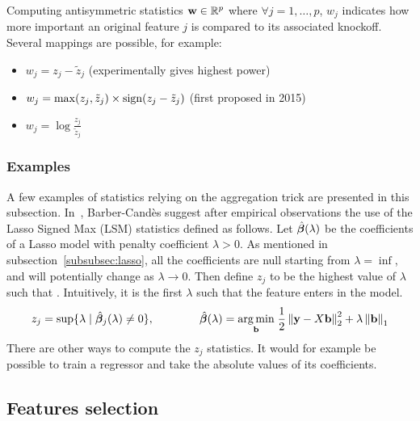 Computing antisymmetric statistics $\mathbf{w} \in \mathbb{R}^p$ where $\forall j = 1, \dots, p$, $w_j$
indicates how more important an original feature $j$ is compared to its associated knockoff.
Several mappings are possible, for example:
\begin{itemize}
    \item $w_j = z_j - \tilde{z}_j$ (experimentally gives highest power)
    \item $w_j = \max(z_j, \tilde{z}_j) \times \operatorname*{sign}(z_j - \tilde{z}_j)$ (first proposed in 2015)
    \item $w_j = \log\frac{z_j}{\tilde{z}_j}$
\end{itemize}

\subsubsection{Examples}\label{subsubsec:sce}

A few examples of statistics relying on the aggregation trick are presented in this subsection.
In~\cite{fixed_x_knockoffs}, Barber-Candès suggest after empirical observations the use of the
Lasso Signed Max (LSM) statistics defined as follows.
Let $\hat{\bm{\beta}}(\lambda)$ be the coefficients of a Lasso model with penalty coefficient $\lambda > 0$.
As mentioned in subsection~\ref{subsubsec:lasso},
all the coefficients are null starting from $\lambda = \inf$,
and will potentially change as $\lambda \to 0$.
Then define $z_j$ to be the highest value of $\lambda$ such that .
Intuitively, it is the first $\lambda$ such that the feature enters in the model.
\begin{equation}
    z_j = \sup\{\lambda \mid \hat{\bm{\beta}}_j(\lambda) \neq 0\}
    ,\qquad\qquad
    \hat{\bm{\beta}}(\lambda) =
        \underset{\mathbf{b}}{\operatorname*{arg\,min}}\;
        \frac{1}{2}\left\lVert\mathbf{y} - X\mathbf{b}\right\rVert_2^2 + \lambda\left\lVert\mathbf{b}\right\rVert_1
\end{equation}
There are other ways to compute the $z_j$ statistics.
It would for example be possible to train a regressor and take the absolute values of its coefficients.

\subsection{Features selection}\label{subsec:kfs}

